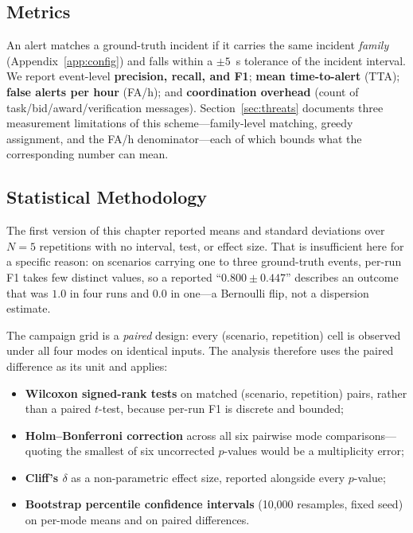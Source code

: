 \subsection{Metrics}

An alert matches a ground-truth incident if it carries the same incident \emph{family} (Appendix~\ref{app:config}) and falls within a $\pm 5$~s tolerance of the incident interval. We report event-level \textbf{precision, recall, and F1}; \textbf{mean time-to-alert} (TTA); \textbf{false alerts per hour} (FA/h); and \textbf{coordination overhead} (count of task/bid/award/verification messages). Section~\ref{sec:threats} documents three measurement limitations of this scheme---family-level matching, greedy assignment, and the FA/h denominator---each of which bounds what the corresponding number can mean.

\subsection{Statistical Methodology}
\label{sec:stats_method}

The first version of this chapter reported means and standard deviations over $N=5$ repetitions with no interval, test, or effect size. That is insufficient here for a specific reason: on scenarios carrying one to three ground-truth events, per-run F1 takes few distinct values, so a reported ``$0.800\pm0.447$'' describes an outcome that was $1.0$ in four runs and $0.0$ in one---a Bernoulli flip, not a dispersion estimate.

The campaign grid is a \emph{paired} design: every (scenario, repetition) cell is observed under all four modes on identical inputs. The analysis therefore uses the paired difference as its unit and applies:

\begin{itemize}
	\item \textbf{Wilcoxon signed-rank tests} on matched (scenario, repetition) pairs, rather than a paired $t$-test, because per-run F1 is discrete and bounded;
	\item \textbf{Holm--Bonferroni correction} across all six pairwise mode comparisons---quoting the smallest of six uncorrected $p$-values would be a multiplicity error;
	\item \textbf{Cliff's $\delta$} as a non-parametric effect size, reported alongside every $p$-value;
	\item \textbf{Bootstrap percentile confidence intervals} (10{,}000 resamples, fixed seed) on per-mode means and on paired differences.
\end{itemize}

